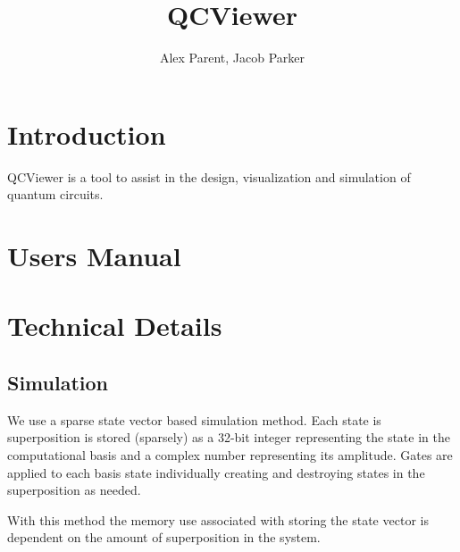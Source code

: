 \documentclass{article}
\begin{document}
\title{QCViewer}
\author{Alex Parent, Jacob Parker}
\maketitle

\section{Introduction}
QCViewer is a tool to assist in the design, visualization and simulation of quantum circuits.

\section{Users Manual}

\section{Technical Details}
\subsection{Simulation}
We use a sparse state vector based simulation method.  Each state is superposition is stored (sparsely) as a 32-bit integer representing the state in the computational basis
and a complex number representing its amplitude. Gates are applied to each basis state individually creating and destroying states in the superposition as needed.

With this method the memory use associated with storing the state vector is dependent on the amount of superposition in the system.
%
%
\end{document}
